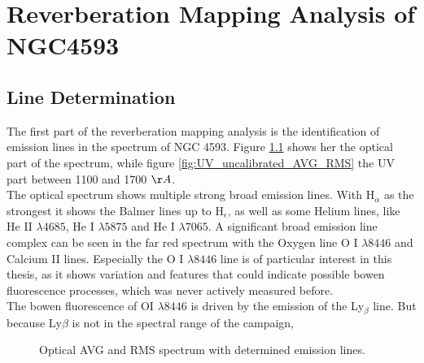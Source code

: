 \chapter{Reverberation Mapping Analysis of NGC4593}
\label{cap: Results}

\section{Line Determination}

 The first part of the reverberation mapping analysis is the identification of emission lines in the spectrum of NGC 4593. Figure \ref{fig:AVG_RMS_SPECTRUM} shows her the optical part of the spectrum, while figure \ref{fig:UV_uncalibrated_AVG_RMS} the UV part between 1100 and 1700 $\AA$. \\
 The optical spectrum shows multiple strong broad emission lines. With H$_\alpha$ as the strongest it shows the Balmer lines up to H$_\epsilon$, as well as some Helium lines, like He II $\lambda 4685$, He I $\lambda 5875$ and He I $\lambda 7065$. A significant broad emission line complex can be seen in the far red spectrum with the Oxygen line O I $\lambda 8446$ and Calcium II lines. Especially the O I $\lambda 8446$ line is of particular interest in this thesis, as it shows variation and features that could indicate possible bowen fluorescence processes, which was never actively measured before.\\
 The bowen fluorescence of OI $\lambda 8446$ is driven by the emission of the Ly$_\beta$ line. But because Ly$\beta$ is not in the spectral range of the campaign, 
 
 
\begin{figure}[!htbp]
	\centering
	\caption{Optical AVG and RMS spectrum with determined emission lines.}
	\label{fig:AVG_RMS_SPECTRUM}
\end{figure}


